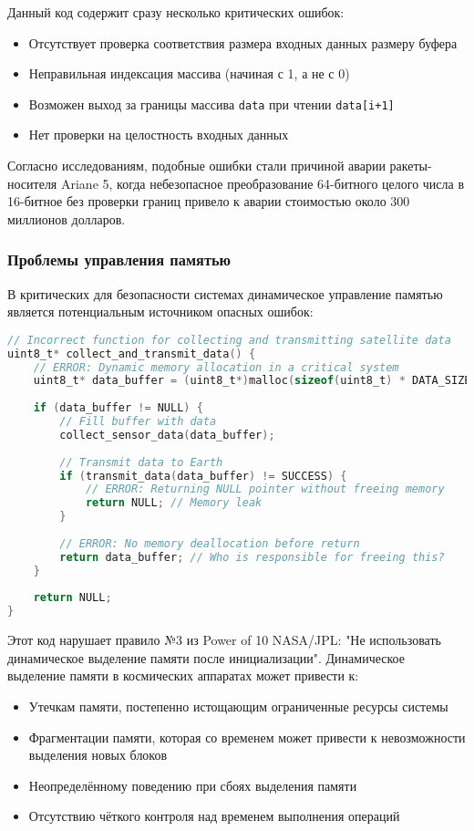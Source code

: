 Данный код содержит сразу несколько критических ошибок:
\begin{itemize}
    \item Отсутствует проверка соответствия размера входных данных размеру буфера
    \item Неправильная индексация массива (начиная с 1, а не с 0)
    \item Возможен выход за границы массива \texttt{data} при чтении \texttt{data[i+1]}
    \item Нет проверки на целостность входных данных
\end{itemize}

Согласно исследованиям, подобные ошибки стали причиной аварии ракеты-носителя Ariane 5, когда небезопасное преобразование 64-битного целого числа в 16-битное без проверки границ привело к аварии стоимостью около 300 миллионов долларов\cite{reddit_cpp}.

\subsubsection{Проблемы управления памятью}

В критических для безопасности системах динамическое управление памятью является потенциальным источником опасных ошибок\cite{anssi}:

\begin{lstlisting}[language=C, caption=Небезопасное использование динамической памяти]
// Incorrect function for collecting and transmitting satellite data
uint8_t* collect_and_transmit_data() {
    // ERROR: Dynamic memory allocation in a critical system
    uint8_t* data_buffer = (uint8_t*)malloc(sizeof(uint8_t) * DATA_SIZE);
    
    if (data_buffer != NULL) {
        // Fill buffer with data
        collect_sensor_data(data_buffer);
        
        // Transmit data to Earth
        if (transmit_data(data_buffer) != SUCCESS) {
            // ERROR: Returning NULL pointer without freeing memory
            return NULL; // Memory leak
        }
        
        // ERROR: No memory deallocation before return
        return data_buffer; // Who is responsible for freeing this?
    }
    
    return NULL;
}
\end{lstlisting}

Этот код нарушает правило №3 из Power of 10 NASA/JPL: "Не использовать динамическое выделение памяти после инициализации"\cite{opensourcesatellite}. Динамическое выделение памяти в космических аппаратах может привести к:
\begin{itemize}
    \item Утечкам памяти, постепенно истощающим ограниченные ресурсы системы
    \item Фрагментации памяти, которая со временем может привести к невозможности выделения новых блоков
    \item Неопределённому поведению при сбоях выделения памяти
    \item Отсутствию чёткого контроля над временем выполнения операций
\end{itemize}

